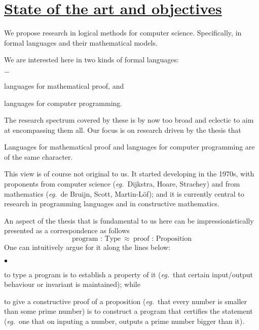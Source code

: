 \documentclass[11pt,twocolumn]{article}
\newenvironment{myitemize}
  {\begin{list}{$\bullet$}
  {\setlength{\topsep}{2pt}
   \setlength{\partopsep}{2pt}
   \setlength{\itemsep}{2.5pt}
   \setlength{\parsep}{2.5pt}
   \setlength{\leftmargin}{1em}
   \setlength{\labelwidth}{.5em}}}
  {\end{list}}
\newenvironment{myindentitemize}
  {\begin{list}{$-$}
  {\setlength{\topsep}{2pt}
   \setlength{\partopsep}{2pt}
   \setlength{\itemsep}{2.5pt}
   \setlength{\parsep}{2.5pt}
   \setlength{\leftmargin}{2.125em}
   \setlength{\labelwidth}{1.625em}}}
  {\end{list}}
\newenvironment{myquote}
  {\begin{list}{}
  {\setlength{\topsep}{2pt}
   \setlength{\partopsep}{2pt}
   \setlength{\itemsep}{2.5pt}
   \setlength{\parsep}{2.5pt}
   \setlength{\rightmargin}{1em}
   \setlength{\leftmargin}{1em}
   \setlength{\labelwidth}{.5em}}}
  {\end{list}}
\newcommand{\eg}{\emph{eg.}}
\begin{document}


\section{\underline{State of the art and ob}j\underline{ectives}}
\label{StateOfTheArtSection}

We propose research in logical methods for computer science.
Specifically, in formal languages and their mathematical models.

We are interested here in two kinds of formal languages:
\begin{myindentitemize}
  \item
    languages for mathematical proof, and 
  \item
    languages for computer programming.
\end{myindentitemize}
The research spectrum covered by these is by now too broad and eclectic to aim
at encompassing them all.  Our focus is on research driven by the thesis that
\begin{myquote}
\item
Languages for mathematical proof and languages for computer programming
are of the same character.
\end{myquote}
This view %
is of course not original to us.  It started developing in the 1970s, with
proponents from computer science (\eg~Dijkstra, Hoare, Strachey) and from
mathematics (\eg~de Bruijn, Scott, Martin-L\"of); and it is currently central
to research in programming languages and in constructive mathematics.

An aspect of the thesis that is fundamental to us here
can be 
impressionistically %
presented as a correspondence as follows
\[
  \mbox{program : Type} \enspace \approx \enspace \mbox{proof : Proposition} 
\]
One can intuitively argue for it along the lines below:
\begin{myitemize} 
\item 
  to type a program is to establish a property of it (\eg~that certain
  input/output behaviour or invariant is maintained); while 
\item 
  to give a constructive proof of a proposition (\eg~that every number is
  smaller than some prime number) is to construct a program that 
  certifies %
  the statement (\eg~one that on inputing a number, outputs a prime number
  bigger than it).
\end{myitemize} 
\end{document}
